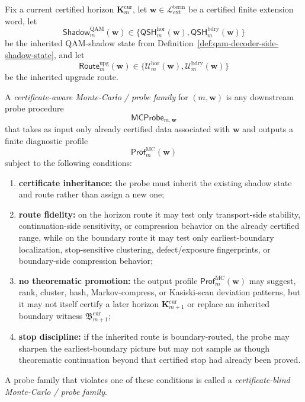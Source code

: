\begin{definition}
\label{def:certificate-aware-monte-carlo-probe-family}
Fix a current certified horizon \(\mathbf K_m^{\mathrm{cur}}\), let \(\mathbf w\in \mathcal L_{\mathrm{ext}}^{\mathrm{term}}\) be a certified finite extension word, let
\[
 \mathsf{Shadow}^{\mathrm{QAM}}_{m}(\mathbf w)
 \in
 \{\mathsf{QSH}^{\mathrm{hor}}_{m}(\mathbf w),\mathsf{QSH}^{\mathrm{bdry}}_{m}(\mathbf w)\}
\]
be the inherited QAM-shadow state from Definition~\ref{def:qam-decoder-side-shadow-state}, and let
\[
 \mathsf{Route}^{\mathrm{upg}}_{m}(\mathbf w)
 \in
 \{\mathcal U^{\mathrm{hor}}_{m}(\mathbf w),\mathcal U^{\mathrm{bdry}}_{m}(\mathbf w)\}
\]
be the inherited upgrade route.

A \emph{certificate-aware Monte-Carlo / probe family} for \((m,\mathbf w)\) is any downstream probe procedure
\[
 \mathsf{MCProbe}_{m,\mathbf w}
\]
that takes as input only already certified data associated with \(\mathbf w\) and outputs a finite diagnostic profile
\[
 \mathsf{Prof}^{\mathrm{MC}}_{m}(\mathbf w)
\]
subject to the following conditions:
\begin{enumerate}[label=(\roman*)]
 \item \textbf{certificate inheritance:} the probe must inherit the existing shadow state and route rather than assign a new one;
 \item \textbf{route fidelity:} on the horizon route it may test only transport-side stability, continuation-side sensitivity, or compression behavior on the already certified range, while on the boundary route it may test only earliest-boundary localization, stop-sensitive clustering, defect/exposure fingerprints, or boundary-side compression behavior;
 \item \textbf{no theorematic promotion:} the output profile \(\mathsf{Prof}^{\mathrm{MC}}_{m}(\mathbf w)\) may suggest, rank, cluster, hash, Markov-compress, or Kasiski-scan deviation patterns, but it may not itself certify a later horizon \(\mathbf K_{m+1}^{\mathrm{cur}}\) or replace an inherited boundary witness \(\mathfrak B_{m+1}^{\mathrm{cur}}\);
 \item \textbf{stop discipline:} if the inherited route is boundary-routed, the probe may sharpen the earliest-boundary picture but may not sample as though theorematic continuation beyond that certified stop had already been proved.
\end{enumerate}
A probe family that violates one of these conditions is called a \emph{certificate-blind Monte-Carlo / probe family}.
\end{definition}

